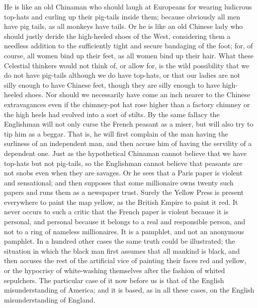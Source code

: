 \documentclass{book}
\begin{document}
He is like an old Chinaman who should laugh at Europeans for wearing ludicrous top-hats and curling up their pig-tails inside them; because obviously all men have pig tails, as all monkeys have tails. Or he is like an old Chinese lady who should justly deride the high-heeled shoes of the West, considering them a needless addition to the sufficiently tight and secure bandaging of the foot; for, of course, all women bind up their feet, as all women bind up their hair. What these Celestial thinkers would not think of, or allow for, is the wild possibility that we do not have pig-tails although we do have top-hats, or that our ladies are not silly enough to have Chinese feet, though they are silly enough to have high-heeled shoes. Nor should we necessarily have come an inch nearer to the Chinese extravagances even if the chimney-pot hat rose higher than a factory chimney or the high heels had evolved into a sort of stilts. By the same fallacy the Englishman will not only curse the French peasant as a miser, but will also try to tip him as a beggar. That is, he will first complain of the man having the surliness of an independent man, and then accuse him of having the servility of a dependent one. Just as the hypothetical Chinaman cannot believe that we have top-hats but not pig-tails, so the Englishman cannot believe that peasants are not snobs even when they are savages. Or he sees that a Paris paper is violent and sensational; and then supposes that some millionaire owns twenty such papers and runs them as a newspaper trust. Surely the Yellow Press is present everywhere to paint the map yellow, as the British Empire to paint it red. It never occurs to such a critic that the French paper is violent because it is personal, and personal because it belongs to a real and responsible person, and not to a ring of nameless millionaires. It is a pamphlet, and not an anonymous pamphlet. In a hundred other cases the same truth could be illustrated; the situation in which the black man first assumes that all mankind is black, and then accuses the rest of the artificial vice of painting their faces red and yellow, or the hypocrisy of white-washing themselves after the fashion of whited sepulchers. The particular case of it now before us is that of the English misunderstanding of America; and it is based, as in all these cases, on the English misunderstanding of England.
\end{document}
